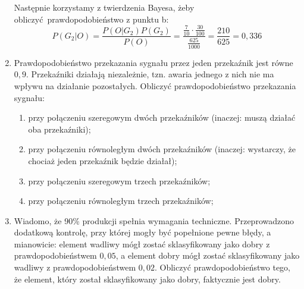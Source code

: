 \documentclass[twoside]{mwart}
\newcommand{\ans}[1]{}
\newenvironment{ansenv}{\comment}{\endcomment}
\newenvironment{ansenv}{\paragraph{Odpowiedź:}}{}
\newcommand{\ans}[1]{\begin{ansenv}#1\end{ansenv}}
\begin{document}
\begin{enumerate}
{	Następnie korzystamy z twierdzenia Bayesa, żeby obliczyć prawdopodobieństwo z punktu b:
	\[ P(G_2|O) = \frac{P(O|G_2)P(G_2)}{P(O)} = \frac{\frac{7}{10}\cdot\frac{30}{100}}{\frac{625}{1000}} = \frac{210}{625}= 0{,}336 \]
}
\item Prawdopodobieństwo przekazania sygnału przez jeden przekaźnik jest równe $0{,}9$. Przekaźniki działają niezależnie, tzn. awaria jednego z nich nie ma wpływu na działanie pozostałych.
Obliczyć prawdopodobieństwo przekazania sygnału:
\begin{enumerate}
\item przy połączeniu szeregowym dwóch przekaźników (inaczej: muszą działać oba przekaźniki);
\item przy połączeniu równoległym dwóch przekaźników (inaczej: wystarczy, że chociaż jeden przekaźnik będzie działał);
\item przy połączeniu szeregowym trzech przekaźników;
\item przy połączeniu równoległym trzech przekaźników;
\end{enumerate}
\ans{
	Oznaczamy zdarzenia:
	\begin{itemize}
		\item $A$ działa 1. przekaźnik
		\item $B$ działa 2. przekaźnik
		\item $C$ działa 3. przekaźnik
	\end{itemize}
	Zdarzenia są niezależne i każde zachodzi z prawdopodobieństwem $0{,}9$.
	Zatem:
	\begin{enumerate}
		\item \[ P(A\cap B)\underset{\text{z niezależności}}{=}P(A)\cdot P(B)=0{,}9\cdot0{,}9=0{,}81 \]
		\item Interesuje nas $P(A\cup B)$. Możemy skorzystać z prawa de Morgana:
		\[P(A\cup B)=P([A'\cap B']')=1-P(A'\cap B') \]
		A następnie z twierdzenia o niezależności zdarzeń przeciwnych:
		\[P(A'\cap B') = P(A')P(B')=(1-0{,}9)^2=0{,}01\]
		Wracając do pierwszego równania otrzymujemy
		\[P(A\cup B)=1-0{,}01=0{,}99\]
		\item \[ P(A\cap B\cap C)\underset{\text{z niezależności}}{=}P(A)\cdot P(B)\cap P(C)=0{,}9^3=0{,}729 \]
		\item Analogicznie jak punkt b:
		\[ P(A\cup B\cup C)=1-P(A'\cap B'\cap C')=1-(1-0{,}1)^3=0{,}999 \]
	\end{enumerate}
}
\item Wiadomo, że 90\% produkcji spełnia wymagania techniczne. Przeprowadzono dodatkową kontrolę, przy której mogły być popełnione pewne błędy, a mianowicie: element wadliwy mógł zostać sklasyfikowany jako dobry z prawdopodobieństwem $0{,}05$, a element dobry mógł zostać sklasyfikowany jako wadliwy z prawdopodobieństwem $0{,}02$. Obliczyć prawdopodobieństwo tego, że element, który został sklasyfikowany jako dobry, faktycznie jest dobry.

\end{enumerate}
\end{document}
